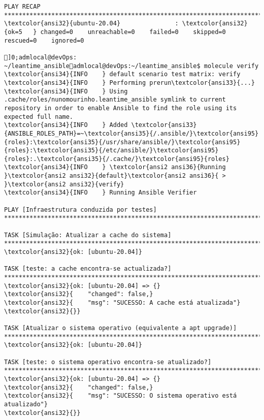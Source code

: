 \documentclass{scrartcl}
\begin{document}
\begin{Verbatim}
PLAY RECAP **********************************************************************************************************************************************************************************
\textcolor{ansi32}{ubuntu-20.04}               : \textcolor{ansi32}{ok=5   } changed=0    unreachable=0    failed=0    skipped=0    rescued=0    ignored=0

]0;admlocal@devOps: ~/leantime_ansibleadmlocal@devOps:~/leantime_ansible$ molecule verify
\textcolor{ansi34}{INFO    } default scenario test matrix: verify
\textcolor{ansi34}{INFO    } Performing prerun\textcolor{ansi33}{...}
\textcolor{ansi34}{INFO    } Using .cache/roles/nunomourinho.leantime_ansible symlink to current repository in order to enable Ansible to find the role using its expected full name.
\textcolor{ansi34}{INFO    } Added \textcolor{ansi33}{ANSIBLE_ROLES_PATH}=~\textcolor{ansi35}{/.ansible/}\textcolor{ansi95}{roles}:\textcolor{ansi35}{/usr/share/ansible/}\textcolor{ansi95}{roles}:\textcolor{ansi35}{/etc/ansible/}\textcolor{ansi95}{roles}:.\textcolor{ansi35}{/.cache/}\textcolor{ansi95}{roles}
\textcolor{ansi34}{INFO    } \textcolor{ansi2 ansi36}{Running }\textcolor{ansi2 ansi32}{default}\textcolor{ansi2 ansi36}{ > }\textcolor{ansi2 ansi32}{verify}
\textcolor{ansi34}{INFO    } Running Ansible Verifier

PLAY [Infraestrutura conduzida por testes] **************************************************************************************************************************************************

TASK [Simulação: Atualizar a cache do sistema] **********************************************************************************************************************************************
\textcolor{ansi32}{ok: [ubuntu-20.04]}

TASK [teste: a cache encontra-se actualizada?] **********************************************************************************************************************************************
\textcolor{ansi32}{ok: [ubuntu-20.04] => {}
\textcolor{ansi32}{    "changed": false,}
\textcolor{ansi32}{    "msg": "SUCESSO: A cache está atualizada"}
\textcolor{ansi32}{}}

TASK [Atualizar o sistema operativo (equivalente a apt upgrade)] ****************************************************************************************************************************
\textcolor{ansi32}{ok: [ubuntu-20.04]}

TASK [teste: o sistema operativo encontra-se atualizado?] ***********************************************************************************************************************************
\textcolor{ansi32}{ok: [ubuntu-20.04] => {}
\textcolor{ansi32}{    "changed": false,}
\textcolor{ansi32}{    "msg": "SUCESSO: O sistema operativo está atualizado"}
\textcolor{ansi32}{}}


\end{Verbatim}
\end{document}
